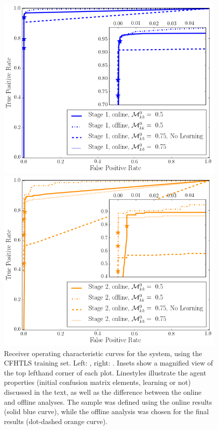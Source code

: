 \documentclass[useAMS,usenatbib,a4paper]{mn2e}
\begin{document}
\begin{figure}
\begin{minipage}{0.45\linewidth}
  \centering\includegraphics[width=\linewidth]{sw-system-figs/stage1_ROC.png}
\end{minipage}\hfill
\begin{minipage}{0.45\linewidth}
  \centering\includegraphics[width=\linewidth]{sw-system-figs/stage2_ROC.png}
\end{minipage}
\caption{Receiver operating characteristic curves for the \SW system, using
the CFHTLS training set. Left: \StageOne, right: \StageTwo. Insets show a
magnified view of the top lefthand corner of each plot. Linestyles illustrate
the agent properties (initial confusion matrix elements, learning or not)
discussed in the text, as well as the difference between the online and offline
analyses. The \StageTwo sample was defined using the online \StageOne results
(solid blue curve), while the offline analysis was chosen for the final
\StageTwo results (dot-dashed orange curve). }
\label{fig:results:sample:roc}
\end{figure}
\end{document}
